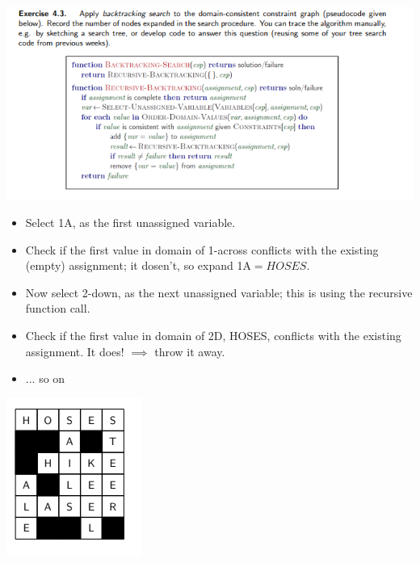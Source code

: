 \documentclass[11pt]{beamer}
\begin{document}
\begin{frame}{4.3}
\includegraphics[scale=0.5]{images/43.png}
\end{frame}

\begin{frame}{4.3}
\pause
\begin{itemize}
	\item Select 1A, as the first unassigned variable. \pause
	\item Check if the first value in domain of 1-across conflicts with the existing (empty) assignment; it dosen't, so expand 1A$=HOSES$.\pause
	\item Now select 2-down, as the next unassigned variable; this is using the recursive function call. \pause
	\item Check if the first value in domain of 2D, HOSES, conflicts with the existing assignment. It does! $\implies$ throw it away.\pause
	\item ... so on \pause
\end{itemize}
\includegraphics[scale=0.4]{images/34solved.png}
\end{frame}
\end{document}
